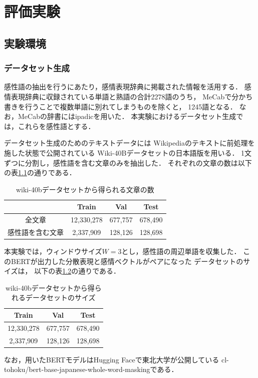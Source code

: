 \chapter{評価実験}

\label{chap:evaluation}

\section{実験環境}
	\subsection{データセット生成}
		感性語の抽出を行うにあたり，感情表現辞典に掲載された情報を活用する．
		感情表現辞典に収録されている単語と熟語の合計2278語のうち，
		MeCabで分かち書きを行うことで複数単語に別れてしまうものを除くと，
		1245語となる．
		なお，MeCabの辞書にはipadicを用いた．
		本実験におけるデータセット生成では，これらを感性語とする．

		データセット生成のためのテキストデータには
		Wikipedia\cite{wikipedia}のテキストに前処理を施した状態で公開されている
		Wiki-40B\cite{wiki-40b}データセットの日本語版を用いる．
		1文ずつに分割し，感性語を含む文章のみを抽出した．
		それぞれの文章の数は以下の表\ref{table:wiki40b_sentence}の通りである．
		\begin{table}[H]
			\centering
			\caption{wiki-40bデータセットから得られる文章の数}
			\label{table:wiki40b_sentence}
			\begin{tabular}{cccc}
				\hline
				& Train & Val & Test \\
				\hline \hline
				全文章 & 12,330,278 & 677,757 & 678,490 \\
				感性語を含む文章 & 2,337,909 & 128,126 & 128,698 \\
				\hline
			\end{tabular}
		\end{table}
		本実験では，ウィンドウサイズ$W=3$とし，感性語の周辺単語を収集した．
		このBERTが出力した分散表現と感情ベクトルがペアになった
		データセットのサイズは，
		以下の表\ref{table:bert_to_emo_size}の通りである．
		\begin{table}[H]
			\centering
			\caption{wiki-40bデータセットから得られるデータセットのサイズ}
			\label{table:bert_to_emo_size}
			\begin{tabular}{ccc}
				\hline
				Train & Val & Test \\
				\hline \hline
				12,330,278 & 677,757 & 678,490 \\
				2,337,909 & 128,126 & 128,698 \\
				\hline
			\end{tabular}
		\end{table}
		なお，用いたBERTモデルはHugging Face\cite{huggingface}で東北大学が公開している
		cl-tohoku/bert-base-japanese-whole-word-masking\cite{cl-tohoku}である．

